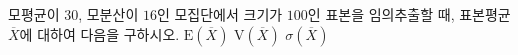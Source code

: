모평균이 $30$, 모분산이 $16$인 모집단에서 크기가 $100$인 표본을 임의추출할 때, 표본평균 $\overline{X}$에 대하여 다음을 구하시오.
 $\mathrm{E}(\overline{X})$
 $\mathrm{V}(\overline{X})$
 $\sigma(\overline{X})$
